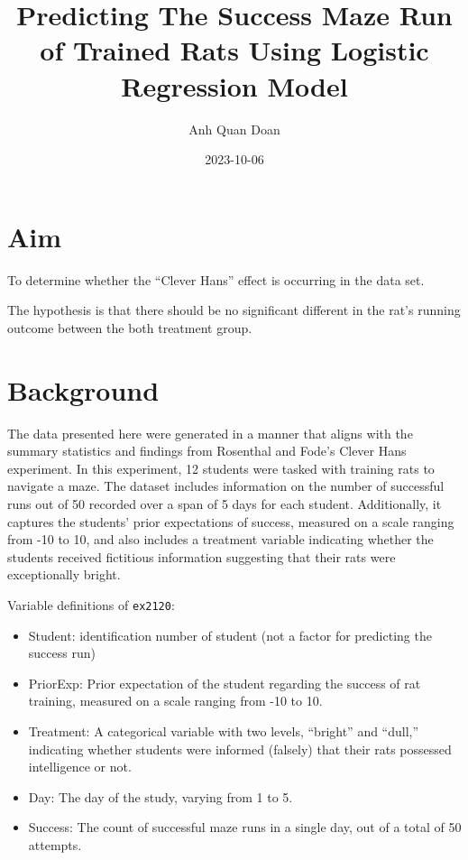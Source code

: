 \documentclass[
]{article}
\title{Predicting The Success Maze Run of Trained Rats Using Logistic
Regression Model}
\author{Anh Quan Doan}
\date{2023-10-06}
\providecommand{\tightlist}{%
  \setlength{\itemsep}{0pt}\setlength{\parskip}{0pt}}
\begin{document}
\maketitle

\hypertarget{aim}{%
\section{Aim}\label{aim}}

To determine whether the ``Clever Hans'' effect is occurring in the data
set.

The hypothesis is that there should be no significant different in the
rat's running outcome between the both treatment group.

\hypertarget{background}{%
\section{Background}\label{background}}

The data presented here were generated in a manner that aligns with the
summary statistics and findings from Rosenthal and Fode's Clever Hans
experiment. In this experiment, 12 students were tasked with training
rats to navigate a maze. The dataset includes information on the number
of successful runs out of 50 recorded over a span of 5 days for each
student. Additionally, it captures the students' prior expectations of
success, measured on a scale ranging from -10 to 10, and also includes a
treatment variable indicating whether the students received fictitious
information suggesting that their rats were exceptionally bright.

Variable definitions of \texttt{ex2120}:

\begin{itemize}
\tightlist
\item
  Student: identification number of student (not a factor for predicting
  the success run)
\item
  PriorExp: Prior expectation of the student regarding the success of
  rat training, measured on a scale ranging from -10 to 10.
\item
  Treatment: A categorical variable with two levels, ``bright'' and
  ``dull,'' indicating whether students were informed (falsely) that
  their rats possessed intelligence or not.
\item
  Day: The day of the study, varying from 1 to 5.
\item
  Success: The count of successful maze runs in a single day, out of a
  total of 50 attempts.
\end{itemize}
\end{document}
